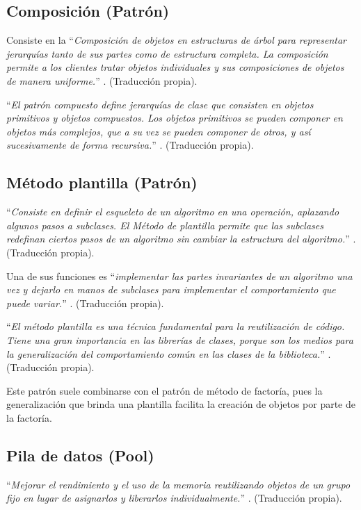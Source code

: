     \subsection{Composición (Patrón)}
    \label{sub:FrameCompose}
        Consiste en la ``\textit{Composición de objetos en estructuras de árbol para representar jerarquías tanto de sus partes como de estructura completa. La composición permite a los clientes tratar objetos individuales y sus composiciones de objetos de manera uniforme.}'' \cite[Pág. 183]{Gamma1994}. (Traducción propia).
        
        ``\textit{El patrón compuesto define jerarquías de clase que consisten en objetos primitivos y objetos compuestos. Los objetos primitivos se pueden componer en objetos más complejos, que a su vez se pueden componer de otros, y así sucesivamente de forma recursiva.}'' \cite[Pág. 186]{Gamma1994}. (Traducción propia).
    
    \subsection{Método plantilla (Patrón)}
    \label{sub:FrameTemplateMethod}
        ``\textit{Consiste en definir el esqueleto de un algoritmo en una operación, aplazando algunos pasos a subclases. El Método de plantilla permite que las subclases redefinan ciertos pasos de un algoritmo sin cambiar la estructura del algoritmo.}'' \cite[Pág. 360]{Gamma1994}. (Traducción propia).
        
        Una de sus funciones es ``\textit{implementar las partes invariantes de un algoritmo una vez y dejarlo en manos de subclases para implementar el comportamiento que puede variar.}'' \cite[Pág. 361]{Gamma1994}. (Traducción propia).
        
        ``\textit{El método plantilla es una técnica fundamental para la reutilización de código. Tiene una gran importancia en las librerías de clases, porque son los medios para la generalización del comportamiento común en las clases de la biblioteca.}'' \cite[Pág. 362]{Gamma1994}. (Traducción propia).
        
        Este patrón suele combinarse con el patrón de método de factoría, pues la generalización que brinda una plantilla facilita la creación de objetos por parte de la factoría.
    
    \subsection{Pila de datos (Pool)}
    \label{sub:FramePool}
        ``\textit{Mejorar el rendimiento y el uso de la memoria reutilizando objetos de un grupo fijo en lugar de asignarlos y liberarlos individualmente.}'' \cite{Nystrom2014}. (Traducción propia).
        
